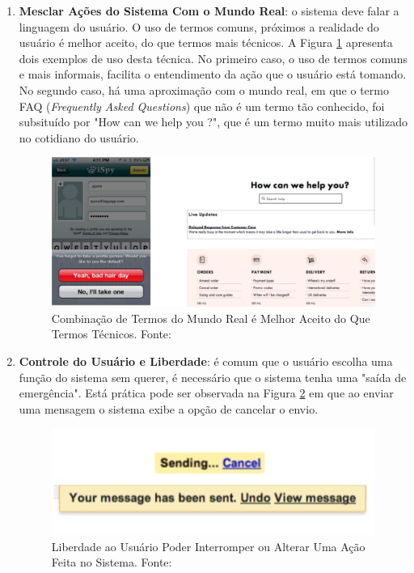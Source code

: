 \begin{enumerate}
  \item\textbf{Mesclar Ações do Sistema Com o Mundo Real}: o sistema deve falar a linguagem do usuário. O uso de termos comuns, próximos a realidade do usuário é melhor aceito, do que termos mais técnicos. A Figura \ref{img:princ2} apresenta dois exemplos de uso desta técnica. No primeiro caso, o uso de termos comuns e mais informais, facilita o entendimento da ação que o usuário está tomando. No segundo caso, há uma aproximação com o mundo real, em que o termo FAQ (\textit{Frequently Asked Questions}) que não é um termo tão conhecido, foi subsituído por "How can we help you ?", que é um termo muito mais utilizado no cotidiano do usuário.
  \graphicspath{{figuras/}}
  \begin{figure}[h!]
  \centering
  \includegraphics[scale=0.40]{princ_2.png}
  \caption{Combinação de Termos do Mundo Real é Melhor Aceito do Que Termos Técnicos. Fonte: \cite{pres_usabilidade}}
  \label{img:princ2}
  \end{figure}
  
  \item\textbf{Controle do Usuário e Liberdade}: é comum que o usuário escolha uma função do sistema sem querer, é necessário que  o sistema tenha uma "saída de emergência". Está prática pode ser observada na Figura \ref{img:princ3} em que ao enviar uma mensagem o sistema exibe a opção de cancelar o envio.
   \graphicspath{{figuras/}}
  \begin{figure}[h!]
  \centering
  \includegraphics[scale=0.70]{princ_3.png}
  \caption{Liberdade ao Usuário Poder Interromper ou Alterar Uma Ação Feita no Sistema. Fonte: \cite{pres_usabilidade}}
  \label{img:princ3}
  \end{figure}
  

\end{enumerate}

